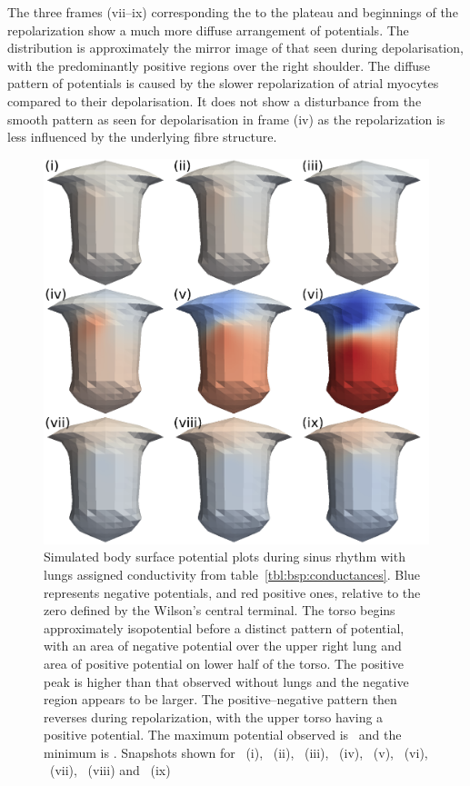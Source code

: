 The three frames (vii--ix) corresponding the to the plateau and beginnings of the
repolarization show a much more diffuse arrangement of potentials.
The distribution is approximately the mirror image of that seen during
depolarisation, with the predominantly positive regions over the right shoulder.
The diffuse pattern of potentials is caused by the slower repolarization of
atrial myocytes compared to their depolarisation.
It does not show a disturbance from the smooth pattern as seen for
depolarisation in frame (iv) as the repolarization is less influenced by the
underlying fibre structure.


\begin{figure}
\includegraphics{figures/bsp/bsp_lungs}
\caption[Body Surface Potential snapshots, with lungs]{
\label{bsp:fig:lungs_bsp}
Simulated body surface potential plots during sinus rhythm with lungs assigned
conductivity from table~\ref{tbl:bsp:conductances}.
Blue represents negative potentials, and red positive ones, relative to the zero
defined by the Wilson's central terminal.
The torso begins approximately isopotential before a distinct pattern of
potential, with an area of negative potential over the upper right lung and
area of positive potential on lower half of the torso.
The positive peak is higher than that observed without lungs and the negative
region appears to be larger.
The positive--negative pattern then reverses during repolarization, with the
upper torso having a positive potential.
The maximum potential observed is \ and the minimum is .
Snapshots shown for \ (i), \ (ii), \ (iii), \ (iv),
\ (v), \ (vi), \ (vii), \ (viii) and \
(ix)
}
\end{figure}

